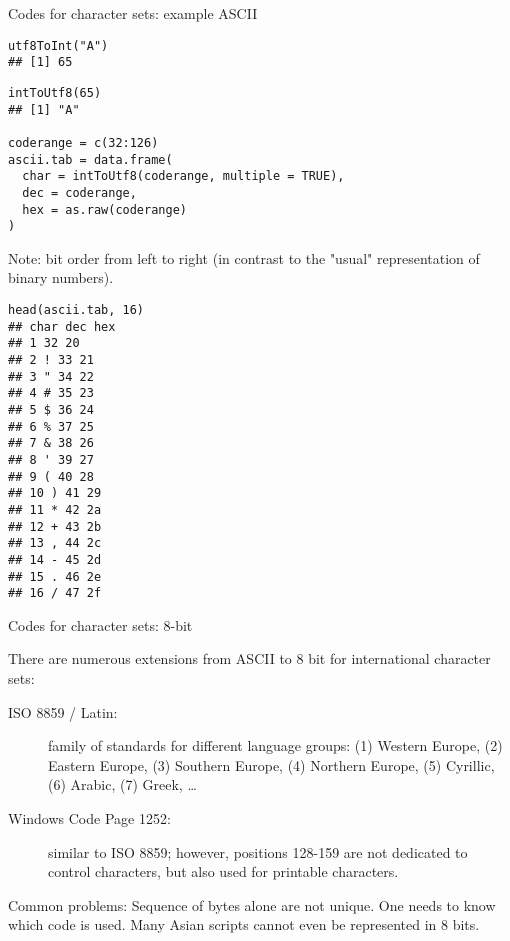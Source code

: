 \documentclass[11pt,compress,t,notes=noshow, xcolor=table]{beamer}
\begin{document}
\begin{vbframe}{Codes for character sets: example ASCII}
\vspace{0.5mm}
\begin{verbatim}
utf8ToInt("A")
## [1] 65
\end{verbatim}

\vspace{0.5mm}
\begin{verbatim}
intToUtf8(65)
## [1] "A"

coderange = c(32:126)
ascii.tab = data.frame(
  char = intToUtf8(coderange, multiple = TRUE),
  dec = coderange,
  hex = as.raw(coderange)
)
\end{verbatim}

\begin{footnotesize}
Note: bit order from left to right (in contrast to the "usual" representation of binary numbers).
\end{footnotesize}

\framebreak

\footnotesize
\begin{verbatim}
head(ascii.tab, 16)
## char dec hex
## 1 32 20
## 2 ! 33 21
## 3 " 34 22
## 4 # 35 23
## 5 $ 36 24
## 6 % 37 25
## 7 & 38 26
## 8 ' 39 27
## 9 ( 40 28
## 10 ) 41 29
## 11 * 42 2a
## 12 + 43 2b
## 13 , 44 2c
## 14 - 45 2d
## 15 . 46 2e
## 16 / 47 2f
\end{verbatim}

\end{vbframe}



\normalsize

\begin{vbframe}{Codes for character sets: 8-bit}

There are numerous extensions from ASCII to $8$ bit for international character sets:
\begin{description}
 \item[ISO 8859 / Latin:] family of standards for different
  language groups: (1) Western Europe, (2) Eastern Europe, (3) Southern Europe, (4)
  Northern Europe, (5) Cyrillic, (6) Arabic, (7) Greek, \ldots
 \item[Windows Code Page 1252:] similar to ISO 8859; however, positions
  128-159 are not dedicated to control characters, but also used for printable characters.
\end{description}

Common problems: Sequence of bytes alone are not unique. One
needs to know which code is used. Many Asian scripts
cannot even be represented in 8 bits.
\end{vbframe}
\end{document}
